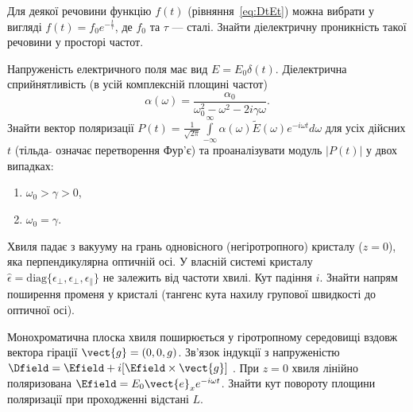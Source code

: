 \begin{problem}
Для деякої речовини функцію $f(t)$ (рівняння~\eqref{eq:DtEt}) можна вибрати у вигляді $f(t) =
f_0e^{-\frac{t}{\tau}}$, де $f_0$ та $\tau$ --- сталі. Знайти діелектричну проникність такої
речовини у просторі частот.
\end{problem}

\begin{problem}
Напруженість електричного поля має вид  $E = E_0\delta(t)$. Діелектрична сприйнятливість (в усій
комплексній площині частот)
\[
	\alpha (\omega ) = \frac{\alpha _0}{\omega _0^2 - \omega ^2 - 2i\gamma \omega }.
\]
Знайти вектор поляризації $P(t) = \frac{1}{\sqrt{2\pi}}\int\limits_{- \infty }^\infty\alpha (\omega
)\tilde E(\omega ){e^{ - i\omega t}}d\omega $ для усіх дійсних $t$  (тільда $\tilde{}$ означає
перетворення Фур’є) та проаналізувати  модуль $|P(t)|$  у двох випадках:
\begin{enumerate}[label=\alph*)]
	\item $\omega_0 > \gamma >0$,
	\item $\omega_0 = \gamma$.
\end{enumerate}
\end{problem}

\begin{problem}
Хвиля падає з вакууму на грань одновісного (негіротропного) кристалу ($z = 0$), яка перпендикулярна
оптичній осі. У власній системі кристалу $\hat{\epsilon} = \mathrm{diag}\{\epsilon_\bot,
\epsilon_\bot, \epsilon_\parallel\}$  не залежить від частоти хвилі. Кут падіння $i$. Знайти напрям
поширення променя у кристалі (тангенс кута нахилу групової швидкості до оптичної осі).
\end{problem}

\begin{problem}
Монохроматична плоска хвиля поширюється у гіротропному середовищі вздовж вектора гірації $\vect{g} =
(0,0,g)$. Зв’язок індукції з напруженістю $\Dfield = \Efield + i[\Efield \times \vect{g} ]$ . При $z=
0$ хвиля лінійно поляризована $\Efield = E_0\vect{e}_x e^{- i\omega t}$. Знайти кут повороту площини
поляризації при проходженні відстані $L$.
\end{problem}

